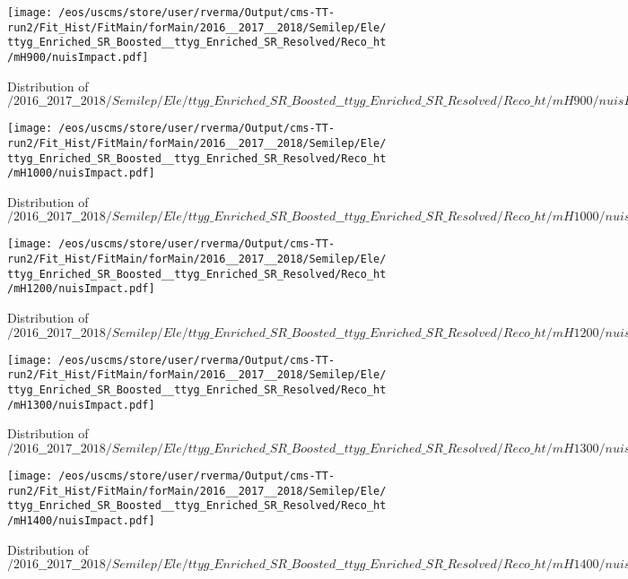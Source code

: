 \begin{figure}
\centering
\texttt{[image: /eos/uscms/store/user/rverma/Output/cms-TT-run2/Fit\_Hist/FitMain/forMain/2016\_\_2017\_\_2018/Semilep/Ele/ttyg\_Enriched\_SR\_Boosted\_\_ttyg\_Enriched\_SR\_Resolved/Reco\_ht/mH900/nuisImpact.pdf]}
\caption{Distribution of $/2016\_\_2017\_\_2018/Semilep/Ele/ttyg\_Enriched\_SR\_Boosted\_\_ttyg\_Enriched\_SR\_Resolved/Reco\_ht/mH900/nuisImpact.pdf$}
\end{figure}

\begin{figure}
\centering
\texttt{[image: /eos/uscms/store/user/rverma/Output/cms-TT-run2/Fit\_Hist/FitMain/forMain/2016\_\_2017\_\_2018/Semilep/Ele/ttyg\_Enriched\_SR\_Boosted\_\_ttyg\_Enriched\_SR\_Resolved/Reco\_ht/mH1000/nuisImpact.pdf]}
\caption{Distribution of $/2016\_\_2017\_\_2018/Semilep/Ele/ttyg\_Enriched\_SR\_Boosted\_\_ttyg\_Enriched\_SR\_Resolved/Reco\_ht/mH1000/nuisImpact.pdf$}
\end{figure}

\begin{figure}
\centering
\texttt{[image: /eos/uscms/store/user/rverma/Output/cms-TT-run2/Fit\_Hist/FitMain/forMain/2016\_\_2017\_\_2018/Semilep/Ele/ttyg\_Enriched\_SR\_Boosted\_\_ttyg\_Enriched\_SR\_Resolved/Reco\_ht/mH1200/nuisImpact.pdf]}
\caption{Distribution of $/2016\_\_2017\_\_2018/Semilep/Ele/ttyg\_Enriched\_SR\_Boosted\_\_ttyg\_Enriched\_SR\_Resolved/Reco\_ht/mH1200/nuisImpact.pdf$}
\end{figure}

\begin{figure}
\centering
\texttt{[image: /eos/uscms/store/user/rverma/Output/cms-TT-run2/Fit\_Hist/FitMain/forMain/2016\_\_2017\_\_2018/Semilep/Ele/ttyg\_Enriched\_SR\_Boosted\_\_ttyg\_Enriched\_SR\_Resolved/Reco\_ht/mH1300/nuisImpact.pdf]}
\caption{Distribution of $/2016\_\_2017\_\_2018/Semilep/Ele/ttyg\_Enriched\_SR\_Boosted\_\_ttyg\_Enriched\_SR\_Resolved/Reco\_ht/mH1300/nuisImpact.pdf$}
\end{figure}

\begin{figure}
\centering
\texttt{[image: /eos/uscms/store/user/rverma/Output/cms-TT-run2/Fit\_Hist/FitMain/forMain/2016\_\_2017\_\_2018/Semilep/Ele/ttyg\_Enriched\_SR\_Boosted\_\_ttyg\_Enriched\_SR\_Resolved/Reco\_ht/mH1400/nuisImpact.pdf]}
\caption{Distribution of $/2016\_\_2017\_\_2018/Semilep/Ele/ttyg\_Enriched\_SR\_Boosted\_\_ttyg\_Enriched\_SR\_Resolved/Reco\_ht/mH1400/nuisImpact.pdf$}
\end{figure}

